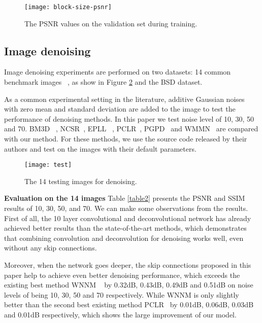 \documentclass[10pt,journal,compsoc]{IEEEtran}
\begin{document}
\begin{figure}[htb!]
\centering
\texttt{[image: block-size-psnr]}
\caption{The PSNR values on the validation set during training.}
\label{fig7}
\end{figure}







\subsection{Image denoising}

Image denoising experiments are performed on two datasets: 14 common benchmark images
~\cite{DBLP:conf/iccv/XuZZZF15,DBLP:conf/iccv/ChenZY15,DBLP:conf/cvpr/LiuXZG15,
DBLP:conf/cvpr/GuZZF14}, as show in Figure \ref{fig12} and the BSD dataset.

As a common
experimental setting in the literature, additive Gaussian noises with zero mean and
standard deviation  are added to the image to test the performance of denoising
methods. In this paper we test noise level  of 10, 30, 50 and 70. BM3D
~\cite{DBLP:journals/tip/DabovFKE07}, NCSR~\cite{DBLP:journals/tip/DongZSL13}, EPLL
~\cite{DBLP:conf/iccv/ZoranW11}, PCLR~\cite{DBLP:conf/iccv/ChenZY15}, PGPD~\cite{DBLP:conf/iccv/XuZZZF15}
and WMMN~\cite{DBLP:conf/cvpr/GuZZF14} are compared with our method. For these methods,
we use the source code released by their authors and test on the images with their default parameters.

\begin{figure}
\centering
\texttt{[image: test]}
\caption{The 14 testing images for denoising.}
\label{fig12}
\end{figure}


{\bf{Evaluation on the 14 images}}  Table \ref{table2} presents the PSNR and SSIM
results of  10, 30, 50, and 70. We can make some observations from the results.
First of all, the 10 layer convolutional and deconvolutional network has already achieved
better results than the state-of-the-art methods, which demonstrates that combining
convolution and deconvolution for denoising works well, even without any skip connections.

Moreover, when the network goes deeper, the skip connections proposed in this paper help to
achieve even better denoising performance, which exceeds the existing best method WNNM
~\cite{DBLP:conf/cvpr/GuZZF14} by 0.32dB, 0.43dB, 0.49dB and 0.51dB on noise levels of 
being 10, 30, 50 and 70 respectively. While WNNM is only slightly better than the second
best existing method PCLR~\cite{DBLP:conf/iccv/ChenZY15} by 0.01dB, 0.06dB, 0.03dB and 0.01dB
respectively, which shows the large improvement of our model.
\end{document}
